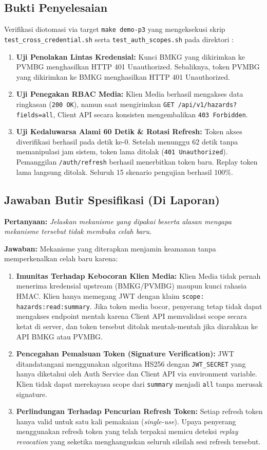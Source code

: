 \subsection{Bukti Penyelesaian}
Verifikasi diotomasi via target \texttt{make demo-p3} yang mengeksekusi skrip \texttt{test\_}\allowbreak\texttt{cross\_}\allowbreak\texttt{credential.sh} serta \texttt{test\_}\allowbreak\texttt{auth\_}\allowbreak\texttt{scopes.sh} pada direktori :
\begin{enumerate}
    \item \textbf{Uji Penolakan Lintas Kredensial:}
    Kunci BMKG yang dikirimkan ke PVMBG menghasilkan HTTP 401 Unauthorized. Sebaliknya, token PVMBG yang dikirimkan ke BMKG menghasilkan HTTP 401 Unauthorized.
    \item \textbf{Uji Penegakan RBAC Media:}
    Klien Media berhasil mengakses data ringkasan (\texttt{200 OK}), namun saat mengirimkan \texttt{GET /api/v1/hazards?fields=all}, Client API secara konsisten mengembalikan \texttt{403 Forbidden}.
    \item \textbf{Uji Kedaluwarsa Alami 60 Detik \& Rotasi Refresh:}
    Token akses diverifikasi berhasil pada detik ke-0. Setelah menunggu 62 detik tanpa memanipulasi jam sistem, token lama ditolak (\texttt{401 Unauthorized}). Pemanggilan \texttt{/auth/refresh} berhasil menerbitkan token baru. Replay token lama langsung ditolak. Seluruh 15 skenario pengujian berhasil 100\%.
\end{enumerate}

\subsection{Jawaban Butir Spesifikasi (Di Laporan)}
\textbf{Pertanyaan:} \textit{Jelaskan mekanisme yang dipakai beserta alasan mengapa mekanisme tersebut tidak membuka celah baru.}

\textbf{Jawaban:}
Mekanisme yang diterapkan menjamin keamanan tanpa memperkenalkan celah baru karena:
\begin{enumerate}
    \item \textbf{Imunitas Terhadap Kebocoran Klien Media:} Klien Media tidak pernah menerima kredensial upstream (BMKG/PVMBG) maupun kunci rahasia HMAC. Klien hanya memegang JWT dengan klaim \texttt{scope: hazards:read:summary}. Jika token media bocor, penyerang tetap tidak dapat mengakses endpoint mentah karena Client API memvalidasi scope secara ketat di server, dan token tersebut ditolak mentah-mentah jika diarahkan ke API BMKG atau PVMBG.
    \item \textbf{Pencegahan Pemalsuan Token (Signature Verification):} JWT ditandatangani menggunakan algoritma HS256 dengan \texttt{JWT\_SECRET} yang hanya diketahui oleh Auth Service dan Client API via environment variable. Klien tidak dapat merekayasa scope dari \texttt{summary} menjadi \texttt{all} tanpa merusak signature.
    \item \textbf{Perlindungan Terhadap Pencurian Refresh Token:} Setiap refresh token hanya valid untuk satu kali pemakaian (\textit{single-use}). Upaya penyerang menggunakan refresh token yang telah terpakai memicu deteksi \textit{replay revocation} yang seketika menghanguskan seluruh silsilah sesi refresh tersebut.
\end{enumerate}
